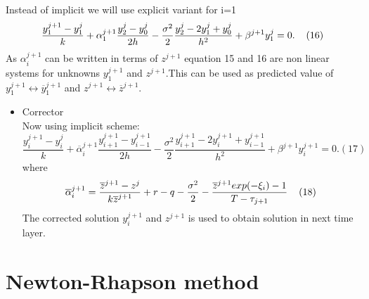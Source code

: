 \documentclass{beamer}
\begin{document}
\begin{frame}
 Instead of implicit we will use explicit variant for i=1 
      \[\frac{y_{1}^{j+1}-y_{1}^{j}}{k}+\alpha_{1}^{j+1}\frac{y_{2}^{j}-y_{0}^{j}}{2h}-\frac{\sigma^2}{2}\frac{y_{2}^{j}-2y_{1}^{j}+y_{0}^{j}}{h^2}+\beta^{j+1}y_{1}^{j}=0.    \hspace{4mm}(16)\]
        As $\alpha_{i}^{j+1}$ can be written in terms of $z^{j+1}$ equation 15 and 16 are non linear systems for unknowns $y_{1}^{j+1}$ and $z^{j+1}$.This can be used as predicted value of $y_{1}^{j+1}\leftrightarrow \overline{y}_{1}^{j+1}$ and $z^{j+1}\leftrightarrow \overline{z}^{j+1}$.
        \begin{itemize}
    \item<1-> Corrector\\
   Now using implicit scheme:
   \[\frac{y_{i}^{j+1}-y_{i}^{j}}{k}+\overline{\alpha}_{i}^{j+1}\frac{y_{i+1}^{j+1}-y_{i-1}^{j+1}}{2h}-\frac{\sigma^2}{2}\frac{y_{i+1}^{j+1}-2y_{i}^{j+1}+y_{i-1}^{j+1}}{h^2}+\beta^{j+1}y_{i}^{j+1}=0.    (17)\]
   where 
   \[\overline{\alpha}_{i}^{j+1}=\frac{\overline{z}^{j+1}-z^{j}}{k\overline{z}^{j+1}}+r-q-\frac{\sigma^2}{2}-\frac{\overline{z}^{j+1}exp(-\xi_{i})-1}{T-\tau_{j+1}} \hspace{4mm}(18)\]
   The corrected solution $y_{i}^{j+1}$ and $z^{j+1}$ is used to obtain solution in next time layer.
\end{itemize}
        
\end{frame}

\section{Newton-Rhapson method}
\end{document}
